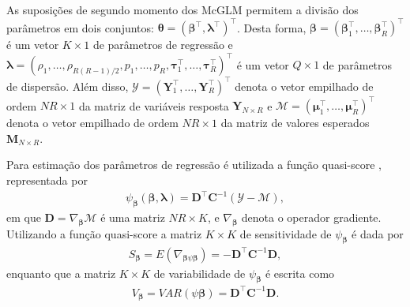 As suposições de segundo momento dos McGLM permitem a divisão dos
parâmetros em dois conjuntos: $\boldsymbol{\theta} = (\boldsymbol{\beta}^{\top}, \boldsymbol{\lambda}^{\top})^{\top}$. Desta forma, $\boldsymbol{\beta} = (\boldsymbol{\beta}_1^\top, \ldots, \boldsymbol{\beta}_R^\top)^\top$ é um vetor $K \times 1$ de parâmetros de regressão e $\boldsymbol{\lambda} = (\rho_1, \ldots, \rho_{R(R-1)/2}, p_1, \ldots, p_R, \boldsymbol{\tau}_1^\top, \ldots, \boldsymbol{\tau}_R^\top)^\top$ é um vetor $Q \times 1$ de parâmetros de dispersão. Além disso, $\mathcal{Y} = (\boldsymbol{Y}_1^\top, \ldots, \boldsymbol{Y}_R^\top)^\top$ denota o vetor empilhado de ordem $NR \times 1$ da matriz de variáveis resposta $\boldsymbol{Y}_{N \times R}$ e $\mathcal{M} = (\boldsymbol{\mu}_1^\top, \ldots, \boldsymbol{\mu}_R^\top)^\top$ denota o vetor empilhado de ordem $NR \times 1$ da matriz de valores esperados $\boldsymbol{M}_{N \times R}$.

Para estimação dos parâmetros de regressão é utilizada a função quasi-score \citep{Liang86}, representada por
\begin{equation}
\label{eq:qs}
      \begin{aligned}
        \psi_{\boldsymbol{\beta}}(\boldsymbol{\beta},
          \boldsymbol{\lambda}) = \boldsymbol{D}^\top
            \boldsymbol{C}^{-1}(\mathcal{Y} - \mathcal{M}),
\end{aligned}
\end{equation}
\noindent em que $\boldsymbol{D} = \nabla_{\boldsymbol{\beta}} \mathcal{M}$ 
é uma matriz $NR \times K$, e $\nabla_{\boldsymbol{\beta}}$ denota o 
operador gradiente. Utilizando a função quasi-score a matriz $K \times K$
de sensitividade de $\psi_{\boldsymbol{\beta}}$ é dada por
\begin{equation}
\begin{aligned}
S_{\boldsymbol{\beta}} = E(\nabla_{\boldsymbol{\beta} \psi \boldsymbol{\beta}}) = -\boldsymbol{D}^{\top} \boldsymbol{C}^{-1} \boldsymbol{D},
\end{aligned}
\end{equation}
\noindent enquanto que a matriz $K \times K$ de variabilidade de $\psi_{\boldsymbol{\beta}}$ é escrita como
\begin{equation}
\begin{aligned}
V_{\boldsymbol{\beta}} = VAR(\psi \boldsymbol{\beta}) = \boldsymbol{D}^{\top} \boldsymbol{C}^{-1} \boldsymbol{D}.
\end{aligned}
\end{equation}

